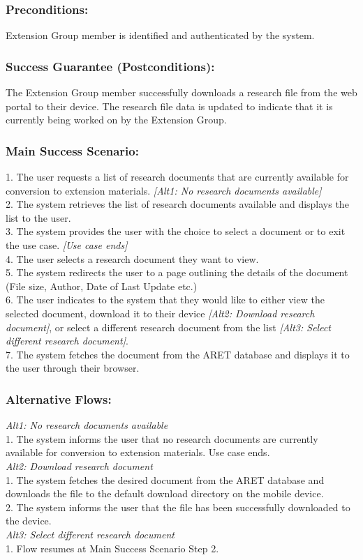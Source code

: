 \documentclass[12pt,letterpaper]{article}
\begin{document}
\subsubsection*{Preconditions:}
Extension Group member is identified and authenticated by the system.

\subsubsection*{Success Guarantee (Postconditions):}
The Extension Group member successfully downloads a research file from the web portal to their device. The research file data is updated to indicate that it is currently being worked on by the Extension Group.

\subsubsection*{Main Success Scenario:}
1. The user requests a list of research documents that are currently available for conversion to extension materials. \emph{[Alt1: No research documents available]}\\
2. The system retrieves the list of research documents available and displays the list to the user.\\
3. The system provides the user with the choice to select a document or to exit the use case. \emph{[Use case ends]}\\
4. The user selects a research document they want to view.\\
5. The system redirects the user to a page outlining the details of the document (File size, Author, Date of Last Update etc.) \\
6. The user indicates to the system that they would like to either view the selected document, download it to their device \emph{[Alt2: Download research document]}, or select a different research document from the list \emph{[Alt3: Select different research document]}.\\ 
7. The system fetches the document from the ARET database and displays it to the user through their browser.

\subsubsection*{Alternative Flows:}
\emph{Alt1: No research documents available}\\
1. The system informs the user that no research documents are currently available for conversion to extension materials. Use case ends.\\[10pt]
\emph{Alt2: Download research document}\\
1. The system fetches the desired document from the ARET database and downloads the file to the default download directory on the mobile device. \\
2. The system informs the user that the file has been successfully downloaded to the device. \\[10pt]
\emph{Alt3: Select different research document}\\
1. Flow resumes at Main Success Scenario Step 2.
\end{document}
